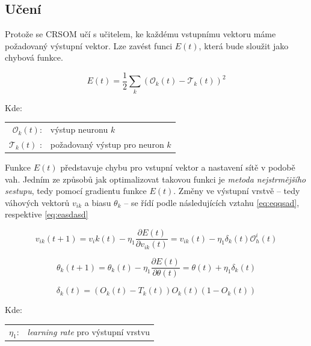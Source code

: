 \documentclass[thesis=M,czech]{FITthesis}[2012/06/26]
\begin{document}
\subsection{Učení}
Protože se CRSOM učí s učitelem, ke každému vstupnímu vektoru máme požadovaný výstupní vektor. Lze zavést funci $E(t)$, která bude sloužit jako chybová funkce.

\vspace{\baselineskip}
\noindent
\begin{minipage}[c]{\textwidth }

\begin{equation} \label{eq:e}
   E(t)=\frac{1}{2}\sum\limits_k{(\mathcal{O}_k(t)-\mathcal{T}_k(t))^2}  
\end{equation}


Kde:\\
\hspace*{3em}
\begin{tabular}{rl}
    $\mathcal{O}_k(t)$:& výstup neuronu $k$ \\
    $\mathcal{T}_k(t) $ :& požadovaný výstup pro neuron $k$ \\

\end{tabular}
\end{minipage} 
\vspace{\baselineskip}
\noindent


Funkce $E(t)$ představuje chybu pro vstupní vektor a nastavení sítě v podobě vah. Jedním ze způsobů jak optimalizovat takovou funkci je \textit{metoda nejstrmějšího sestupu}, tedy pomocí gradientu funkce $E(t)$. Změny ve výstupní vrstvě -- tedy váhových vektorů $v_{ik}$ a biasu $ \theta_k$ -- se řídí podle následujících vztahu \ref{eq:eqqsad}, respektive \ref{eq:easdasd}

\vspace{\baselineskip}
\noindent
\begin{minipage}[c]{\textwidth }

\begin{equation}\label{eq:eqqsad}
   v_{ik}(t+1)=v_ik(t) - \eta_1\frac{\partial{E(t)}}{\partial{v_{ik}(t)}} =  v_{ik}(t) - \eta_1\delta_k(t)\mathcal{O}_h^i(t) 
\end{equation}

\begin{equation}\label{eq:easdasd}
   \theta_k(t+1)=\theta_k(t) - \eta_1\frac{\partial{E(t)}}{\partial{\theta(t)}} = \theta(t)  + \eta_1\delta_k(t)
\end{equation}

\begin{equation*}
   \delta_k(t) = (O_k(t) - T_k(t))O_k(t)(1-O_k(t)) 
\end{equation*}

Kde:\\
\hspace*{3em}
\begin{tabular}{rl}
    $\eta_1$:& \textit{learning rate} pro výstupní vrstvu \\
\end{tabular}
\end{minipage} 
\vspace{\baselineskip}
\noindent
\end{document}
